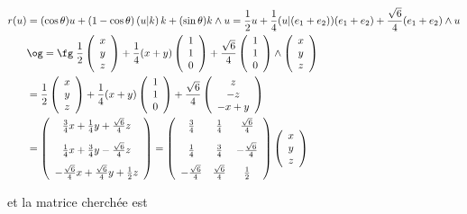 {{\begin{align*}\ensuremath
r(u)&=(\cos\theta)u+(1-\cos\theta)\left(u|k\right)k+(\sin\theta)k\wedge u=\frac{1}{2}u +\frac{1}{4}(u|(e_1+e_2))(e_1+e_2)+\frac{\sqrt{6}}{4}(e_1+e_2)\wedge u\\
 &\text{\og}=\text{\fg}\;\frac{1}{2}\left(
 \begin{array}{c}
 x\\
 y\\
 z
 \end{array}
 \right)+\frac{1}{4}(x+y)\left(
 \begin{array}{c}
 1\\
 1\\
 0
 \end{array}
 \right)+\frac{\sqrt{6}}{4}\left(
 \begin{array}{c}
 1\\
 1\\
 0
 \end{array}
 \right)\wedge\left(
 \begin{array}{c}
 x\\
 y\\
 z
 \end{array}
 \right)\\
  &=\frac{1}{2}\left(
 \begin{array}{c}
 x\\
 y\\
 z
 \end{array}
 \right)+\frac{1}{4}(x+y)\left(
 \begin{array}{c}
 1\\
 1\\
 0
 \end{array}
 \right)+\frac{\sqrt{6}}{4}\left(
 \begin{array}{c}
 z\\
 -z\\
 -x+y
 \end{array}
 \right)\\
 &=\left(
 \begin{array}{c}
 \frac{3}{4}x+\frac{1}{4}y+\frac{\sqrt{6}}{4}z\\
\rule[-4mm]{0mm}{11mm}\frac{1}{4}x+\frac{3}{4}y-\frac{\sqrt{6}}{4}z\\
-\frac{\sqrt{6}}{4}x+\frac{\sqrt{6}}{4}y+\frac{1}{2}z
 \end{array}
 \right)=\left(
 \begin{array}{cccc}
 \frac{3}{4}&\frac{1}{4}&\frac{\sqrt{6}}{4}\\
\rule[-4mm]{0mm}{11mm}\frac{1}{4}&\frac{3}{4}&-\frac{\sqrt{6}}{4}\\
-\frac{\sqrt{6}}{4}&\frac{\sqrt{6}}{4}&\frac{1}{2}
 \end{array}
 \right)\left(
 \begin{array}{c}
x\\
y\\
z
 \end{array}
 \right)
\end{align*}

et la matrice cherchée est

\begin{center}
 \end{center}
}
}
